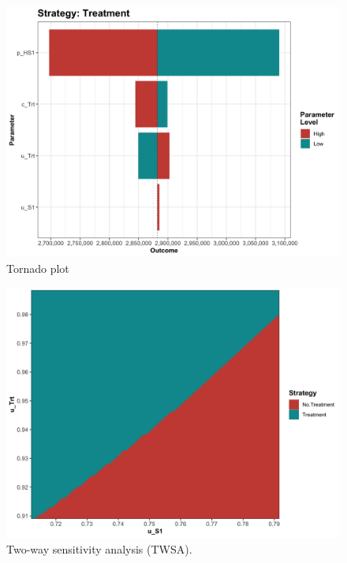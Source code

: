 \documentclass[]{book}
\begin{document}
\begin{figure}

{\centering \includegraphics[width=33.33in]{../figs/05b_tornado_lrm_Treatment_nmb} 

}

\caption{Tornado plot}\label{fig:05b-tornado-lrm-Treatment-nmb}
\end{figure}

\begin{figure}

{\centering \includegraphics[width=33.33in]{../figs/05b_twsa_lrm_uS1_uTrt_nmb} 

}

\caption{Two-way sensitivity analysis (TWSA).}\label{fig:05b-twsa-lrm-uS1-uTrt-nmb}
\end{figure}
\end{document}
